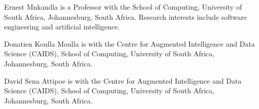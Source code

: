 \documentclass{ieeeaccess}
\begin{document}
\begin{IEEEbiographynophoto}{Ernest Mnkandla} is a Professor with the School of Computing, University of South Africa, Johannesburg, South Africa. Research interests include software engineering and artificial intelligence.
\end{IEEEbiographynophoto}

\begin{IEEEbiographynophoto}{Donatien Koulla Moulla} is with the Centre for Augmented Intelligence and Data Science (CAIDS), School of Computing, University of South Africa, Johannesburg, South Africa.
\end{IEEEbiographynophoto}

\begin{IEEEbiographynophoto}{David Sena Attipoe} is with the Centre for Augmented Intelligence and Data Science (CAIDS), School of Computing, University of South Africa, Johannesburg, South Africa.
\end{IEEEbiographynophoto}

\EOD
\end{document}
